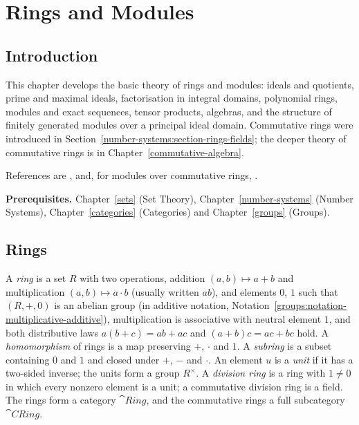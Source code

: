 \chapter{Rings and Modules}\label{rings}

\section{Introduction}\label{rings:section-introduction}

This chapter develops the basic theory of rings and modules: ideals and
quotients, prime and maximal ideals, factorisation in integral domains,
polynomial rings, modules and exact sequences, tensor products, algebras, and
the structure of finitely generated modules over a principal ideal domain.
Commutative rings were introduced in Section~\ref{number-systems:section-rings-fields};
the deeper theory of commutative rings is in Chapter~\ref{commutative-algebra}.

References are \cite{lang-algebra}, \cite{dummit-foote} and, for modules over
commutative rings, \cite{atiyah-macdonald}.

\noindent\textbf{Prerequisites.} Chapter~\ref{sets} (Set Theory),
Chapter~\ref{number-systems} (Number Systems), Chapter~\ref{categories}
(Categories) and Chapter~\ref{groups} (Groups).

\section{Rings}\label{rings:section-rings}

\begin{definition}\label{rings:definition-ring}
A \emph{ring} is a set $R$ with two operations, addition $(a, b) \mapsto a + b$ and
multiplication $(a, b) \mapsto a \cdot b$ (usually written $ab$), and elements $0$, $1$
such that $(R, +, 0)$ is an abelian group (in additive notation,
Notation~\ref{groups:notation-multiplicative-additive}), multiplication is associative with
neutral element $1$, and both distributive laws $a(b + c) = ab + ac$ and
$(a + b)c = ac + bc$ hold. A \emph{homomorphism} of rings is a map preserving $+$,
$\cdot$ and $1$. A \emph{subring} is a subset containing $0$ and $1$ and closed under
$+$, $-$ and $\cdot$. An element $u$ is a \emph{unit} if it has a two-sided inverse;
the units form a group $R^\times$. A \emph{division ring} is a ring with $1 \neq 0$ in
which every nonzero element is a unit; a commutative division ring is a field.
The rings form a category $\cat{Ring}$, and the commutative rings a full subcategory
$\cat{CRing}$.
\end{definition}

